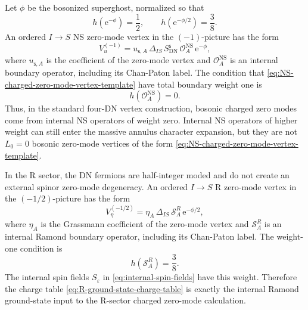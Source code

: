 \documentclass[11pt]{article}
\newcommand{\NS}{\mathrm{NS}}
\newcommand{\DN}{\mathrm{DN}}
\newcommand{\e}{\mathrm{e}}
\begin{document}
Let \(\phi\) be the bosonized superghost, normalized so that
\begin{equation}
  h(\e^{-\phi})=\frac12,
  \qquad
  h(\e^{-\phi/2})=\frac38.
  \label{eq:superghost-weights}
\end{equation}
An ordered \(I\to S\) NS zero-mode vertex in the \((-1)\)-picture has the form
\begin{equation}
  V_{u}^{(-1)}
  =
  u_{\mathsf s,A}\,
  \Delta_{IS}\,
  S_{\DN}^{\mathsf s}\,
  \mathcal O_A^{\NS}\,
  \e^{-\phi},
  \label{eq:NS-charged-zero-mode-vertex-template}
\end{equation}
where \(u_{\mathsf s,A}\) is the coefficient of the zero-mode vertex and \(\mathcal O_A^{\NS}\) is an
internal boundary operator, including its Chan-Paton label. The condition that
\eqref{eq:NS-charged-zero-mode-vertex-template} have total boundary weight one is
\begin{equation}
  h(\mathcal O_A^{\NS})=0.
  \label{eq:NS-internal-zero-mode-weight}
\end{equation}
Thus, in the standard four-DN vertex construction, bosonic charged zero modes come from
internal NS operators of weight zero. Internal NS operators of higher weight can still enter the
massive annulus character expansion, but they are not \(L_0=0\) bosonic zero-mode vertices
of the form \eqref{eq:NS-charged-zero-mode-vertex-template}.

In the R sector, the DN fermions are half-integer moded and do not create an external spinor
zero-mode degeneracy. An ordered \(I\to S\) R zero-mode vertex in the \((-1/2)\)-picture has the
form
\begin{equation}
  V_{\eta}^{(-1/2)}
  =
  \eta_A\,
  \Delta_{IS}\,
  \mathcal S_A^{R}\,
  \e^{-\phi/2},
  \label{eq:R-charged-zero-mode-vertex-template}
\end{equation}
where \(\eta_A\) is the Grassmann coefficient of the zero-mode vertex and \(\mathcal S_A^{R}\) is an internal
Ramond boundary operator, including its Chan-Paton label. The weight-one condition is
\begin{equation}
  h(\mathcal S_A^{R})=\frac38.
  \label{eq:R-internal-zero-mode-weight}
\end{equation}
The internal spin fields \(S_\varepsilon\) in \eqref{eq:internal-spin-fields} have this weight.
Therefore the charge table \eqref{eq:R-ground-state-charge-table} is exactly the internal
Ramond ground-state input to the R-sector charged zero-mode calculation.
\end{document}
